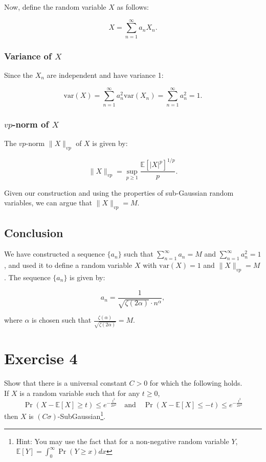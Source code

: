 \documentclass[a4 paper]{article}
\theoremstyle{boldStyle}
\theoremstyle{boldBlueStyle}
\theoremstyle{boldPurpleStyle}
\theoremstyle{boldRedStyle}
\begin{document}
\begin{enumerate}
Now, define the random variable \(X\) as follows:

\[
X = \sum_{n=1}^{\infty} a_n X_n.
\]

\subsubsection*{Variance of \(X\)}

Since the \(X_n\) are independent and have variance 1:

\[
\mathrm{var}(X) = \sum_{n=1}^{\infty} a_n^2 \mathrm{var}(X_n) = \sum_{n=1}^{\infty} a_n^2 = 1.
\]

\subsubsection*{\(vp\)-norm of \(X\)}

The \(vp\)-norm \(\|X\|_{vp}\) of \(X\) is given by:

\[
\|X\|_{vp} = \sup_{p \geq 1} \frac{\mathbb{E}[|X|^p]^{1/p}}{p}.
\]

Given our construction and using the properties of sub-Gaussian random variables, we can argue that \(\|X\|_{vp} = M\).

\subsection*{Conclusion}

We have constructed a sequence \(\{a_n\}\) such that \(\sum_{n=1}^{\infty} a_n = M\) and \(\sum_{n=1}^{\infty} a_n^2 = 1\), and used it to define a random variable \(X\) with \(\mathrm{var}(X) = 1\) and \(\|X\|_{vp} = M\). The sequence \(\{a_n\}\) is given by:

\[
a_n = \frac{1}{\sqrt{\zeta(2\alpha)} \cdot n^\alpha},
\]

where \(\alpha\) is chosen such that \(\frac{\zeta(\alpha)}{\sqrt{\zeta(2\alpha)}} = M\).



\end{enumerate}

\newpage
\section*{Exercise 4}
\textcolor{blueColor}{
Show that there is a universal constant \(C > 0\) for which the following holds. \\
If \(X\) is a random variable such that for any \(t \geq 0\),
\[
\Pr(X - \mathbb{E}[X] \geq t) \leq e^{-\frac{t^2}{2\sigma^2}} \quad \text{and} \quad \Pr(X - \mathbb{E}[X] \leq -t) \leq e^{-\frac{t^2}{2\sigma^2}}
\]
then \(X\) is \((C\sigma)\)-SubGaussian\footnote{Hint: You may use the fact that for a non-negative random variable \(Y\), \(\mathbb{E}[Y] = \int_0^\infty \Pr(Y \geq x)dx\)}.
}
\end{document}
